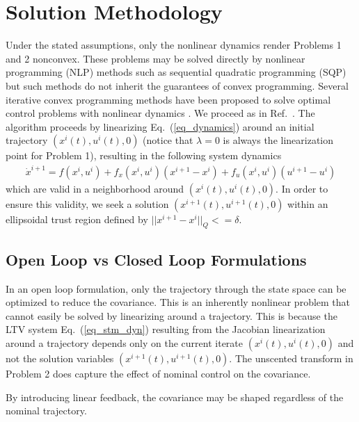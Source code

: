 \documentclass[10pt,a4paper]{article}
\begin{document}
	\section{Solution Methodology}
	Under the stated assumptions, only the nonlinear dynamics render Problems 1 and 2 nonconvex. These problems may be solved directly by nonlinear programming (NLP) methods such as sequential quadratic programming (SQP) but such methods do not inherit the guarantees of convex programming.
	Several iterative convex programming methods have been proposed to solve optimal control problems with nonlinear dynamics \cite{SeqConProg,SuccConvex1}. We proceed as in Ref.~\cite{SuccConvex1}. The algorithm proceeds by linearizing Eq.~(\ref{eq_dynamics}) around an initial trajectory $ (x^i(t),u^i(t),0) $ (notice that $ \lambda=0 $ is always the linearization point for Problem 1), resulting in the following system dynamics
	\begin{align}
	\dot{x}^{i+1} = f(x^{i},u^i) + f_x(x^i,u^i)(x^{i+1}-x^i) + f_u(x^i,u^i)(u^{i+1}-u^i) \label{eq_linearized}
	\end{align}
	which are valid in a neighborhood around $ (x^i(t),u^i(t),0) $. In order to ensure this validity, we seek a solution $ (x^{i+1}(t),u^{i+1}(t),0) $ within an ellipsoidal trust region defined by $||x^{i+1}-x^i||_Q <= \delta$.
	
	
	\subsection{Open Loop vs Closed Loop Formulations}
	In an open loop formulation, only the trajectory through the state space can be optimized to reduce the covariance. This is an inherently nonlinear problem that cannot easily be solved by linearizing around a trajectory. This is because the LTV system Eq.~(\ref{eq_stm_dyn}) resulting from the Jacobian linearization around a trajectory depends only on the current iterate $ (x^i(t),u^i(t),0) $ and not the solution variables $ (x^{i+1}(t),u^{i+1}(t),0) $. The unscented transform in Problem 2 does capture the effect of nominal control on the covariance. 
	
	

	
	By introducing linear feedback, the covariance may be shaped regardless of the nominal trajectory. 
		
		
		
	

	
\end{document}
